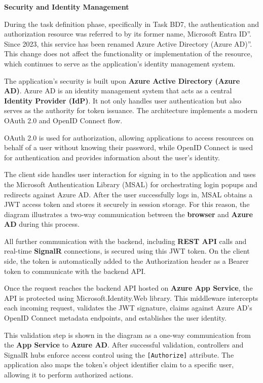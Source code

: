 \vspace{3.5cm}

\textbf{Security and Identity Management}

During the task definition phase, specifically in Task BD7, the authentication and authorization resource was referred to by its former name, Microsoft Entra ID''. Since 2023, this service has been renamed Azure Active Directory (Azure AD)''. This change does not affect the functionality or implementation of the resource, which continues to serve as the application's identity management system.

The application's security is built upon \textbf{Azure Active Directory (Azure AD)}. Azure AD is an identity management system that acts as a central \textbf{Identity Provider (IdP)}. It not only handles user authentication but also serves as the authority for token issuance. The architecture implements a modern OAuth 2.0 and OpenID Connect flow. 

OAuth 2.0 is used for authorization, allowing applications to access resources on behalf of a user without knowing their password, while OpenID Connect is used for authentication and provides information about the user's identity.

The client side handles user interaction for signing in to the application and uses the Microsoft Authentication Library (MSAL) for orchestrating login popups and redirects against Azure AD. After the user successfully logs in, MSAL obtains a JWT access token and stores it securely in session storage. For this reason, the diagram illustrates a two-way communication between the \textbf{browser} and \textbf{Azure AD} during this process. 

All further communication with the backend, including \textbf{REST API} calls and real-time \textbf{SignalR} connections, is secured using this JWT token. On the client side, the token is automatically added to the Authorization header as a Bearer token to communicate with the backend API. 

Once the request reaches the backend API hosted on \textbf{Azure App Service}, the API is protected using Microsoft.Identity.Web library. This middleware intercepts each incoming request, validates the JWT signature, claims against Azure AD's OpenID Connect metadata endpoints, and establishes the user identity.

This validation step is shown in the diagram as a one-way communication from the \textbf{App Service} to \textbf{Azure AD}. After successful validation, controllers and SignalR hubs enforce access control using the \texttt{[Authorize]} attribute. The application also maps the token's object identifier claim to a specific user, allowing it to perform authorized actions.
